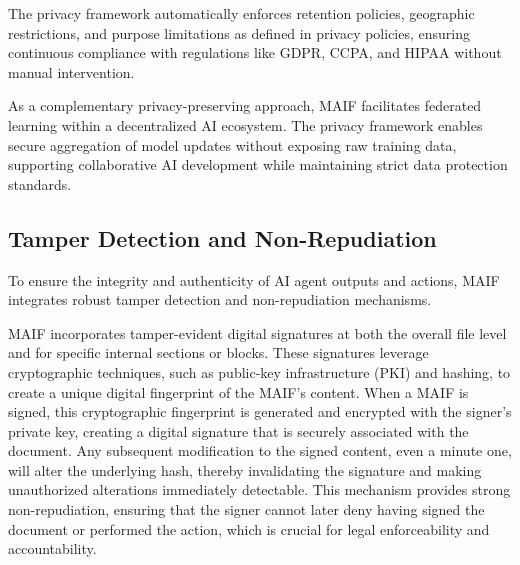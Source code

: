 \documentclass[conference]{IEEEtran}
\begin{document}
The privacy framework automatically enforces retention policies, geographic restrictions, and purpose limitations as defined in privacy policies, ensuring continuous compliance with regulations like GDPR, CCPA, and HIPAA without manual intervention.

As a complementary privacy-preserving approach, MAIF facilitates federated learning within a decentralized AI ecosystem\cite{ref85}. The privacy framework enables secure aggregation of model updates without exposing raw training data, supporting collaborative AI development while maintaining strict data protection standards.

\subsection{Tamper Detection and Non-Repudiation}

To ensure the integrity and authenticity of AI agent outputs and actions, MAIF integrates robust tamper detection and non-repudiation mechanisms.

MAIF incorporates tamper-evident digital signatures at both the overall file level and for specific internal sections or blocks\cite{ref65}. These signatures leverage cryptographic techniques, such as public-key infrastructure (PKI) and hashing, to create a unique digital fingerprint of the MAIF's content\cite{ref99}. When a MAIF is signed, this cryptographic fingerprint is generated and encrypted with the signer's private key, creating a digital signature that is securely associated with the document\cite{ref99}. Any subsequent modification to the signed content, even a minute one, will alter the underlying hash, thereby invalidating the signature and making unauthorized alterations immediately detectable\cite{ref65}. This mechanism provides strong non-repudiation, ensuring that the signer cannot later deny having signed the document or performed the action, which is crucial for legal enforceability and accountability\cite{ref65}.
\end{document}
